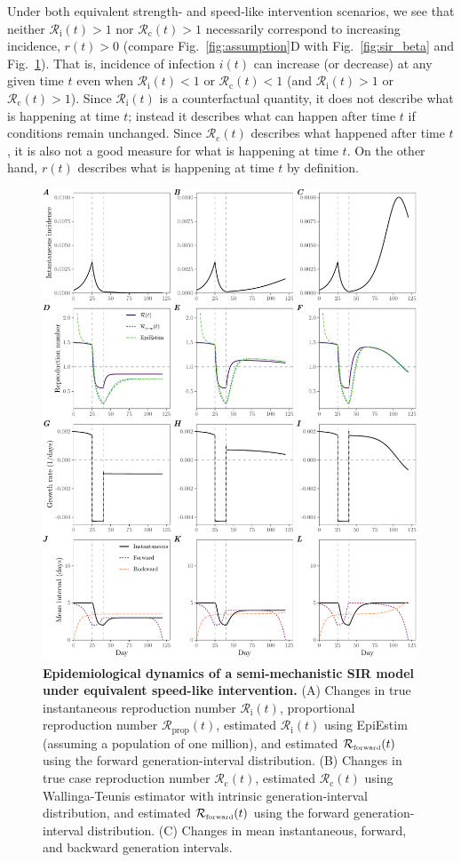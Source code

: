 \documentclass[12pt]{article}
\newcommand{\fref}[1]{Fig.~\ref{fig:#1}}
\newcommand{\Rx}[1]{\ensuremath{{\mathcal R}_{#1}}\xspace}
\newcommand{\Rc}{\Rx{\mathrm{c}}}
\newcommand{\Ri}{\Rx{\mathrm{i}}}
\newcommand{\RR}{\ensuremath{{\mathcal R}}\xspace}
\newcommand{\Rprop}{\Rx{\mathrm{prop}}}
\newcommand{\tsub}[2]{#1_{{\textrm{\tiny #2}}}}
\begin{document}
Under both equivalent strength- and speed-like intervention scenarios, we see that neither $\Ri(t) > 1$ nor $\Rc(t) > 1$ necessarily correspond to increasing incidence, $r(t) > 0$ (compare \fref{assumption}D with \fref{sir_beta} and \fref{sir_semi}).
That is, incidence of infection $i(t)$ can increase (or decrease) at any given time $t$ even when $\Ri(t) < 1$ or $\Rc(t) < 1$ (and $\Ri(t) > 1$ or $\Rc(t) > 1$).
Since $\Ri(t)$ is a counterfactual quantity, it does not describe what is happening at time $t$; instead it describes what can happen after time $t$ if conditions remain unchanged.
Since $\Rc(t)$ describes what happened after time $t$, it is also not a good measure for what is happening at time $t$.
On the other hand, $r(t)$ describes what is happening at time $t$ by definition.

\begin{figure}
\includegraphics[width=\textwidth]{figure_sir_semi.pdf}
\caption{
\textbf{Epidemiological dynamics of a semi-mechanistic SIR model under equivalent speed-like intervention.}
(A) Changes in true instantaneous reproduction number $\Ri(t)$, proportional reproduction number $\Rprop(t)$, estimated $\Ri(t)$ using EpiEstim (assuming a population of one million), and estimated $\tsub{\RR}{forward}(t)$ using the forward generation-interval distribution.
(B) Changes in true case reproduction number $\Rc(t)$, estimated $\Rc(t)$ using Wallinga-Teunis estimator with intrinsic generation-interval distribution, and estimated $\tsub{\RR}{forward}(t)$ using the forward generation-interval distribution.
(C) Changes in mean instantaneous, forward, and backward generation intervals.
}
\label{fig:sir_semi}
\end{figure}
\end{document}
